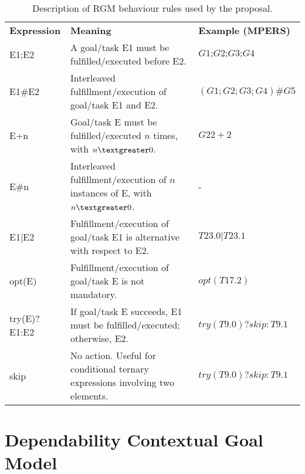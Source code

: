 \begin{table}[h]
{\renewcommand{\arraystretch}{1.5}
\begin{tabularx}{\textwidth}{@{}l|X|X@{}}
\toprule
\textbf{Expression} & \textbf{Meaning}                                                                   & \textbf{Example (MPERS)} \\ 
E1;E2               & A goal/task E1 must be fulfilled/executed before E2.                               & $G1\textbf{;}G2\textbf{;}G3\textbf{;}G4$                 \\ 
E1\#E2              & Interleaved fulfillment/execution of goal/task E1 and E2.                          & $(G1;G2;G3;G4)\textbf{\#}G5$                   \\ 
E+n                 & Goal/task E must be fulfilled/executed $n$ times, with $n \textgreater 0$.             & $G22+2$                    \\
E\#n                & Interleaved fulfillment/execution of $n$ instances of E, with $n \textgreater 0$.      & -                        \\
E1|E2               & Fulfillment/execution of goal/task E1 is alternative with respect to E2. & $T23.0|T23.1$                \\ 
opt(E)              & Fulfillment/execution of goal/task E is not mandatory.                             & $opt(T17.2)$               \\  
try(E)?E1:E2        & If goal/task E succeeds, E1 must be fulfilled/executed; otherwise, E2.             & $try(T9.0)?skip:T9.1$        \\ 
skip                & No action. Useful for conditional ternary expressions involving two elements.      & $try(T9.0)?skip:T9.1$        \\  \bottomrule
\end{tabularx}
}
\caption{Description of RGM behaviour rules used by the proposal.}
\label{tab:RGM_REGEX}
\end{table}


\section{Dependability Contextual Goal Model}

